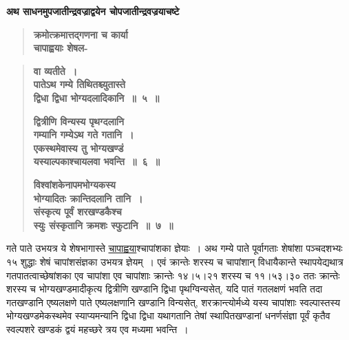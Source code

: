 \documentclass[11pt, openany]{book}
\begin{document}
{\small \textbf{अथ साधनमुपजातीन्द्रवज्राद्वयेन चोपजातीन्द्रवज्रयाचष्टे\textendash }}

 \label{9.5.1}
\begin{quote}
{\large \textbf{{\color{purple}क्रमोत्क्रमात्तद्गणना च कार्या \\
चापाह्वयाः शेषल-}}}
\end{quote}

\newpage

 \label{9.5}
\begin{quote}
{\large \textbf{{\color{purple}वा व्यतीते~। \\
पातेऽथ गम्ये तिथितश्च्युतास्ते \\
द्विधा द्विधा भोग्यदलादिकानि~॥~५~॥}}
\vspace{1mm}

 \label{9.6}
\textbf{{\color{purple}द्वित्रीणि विन्यस्य पृथग्दलानि \\
गम्यानि गम्येऽथ गते गतानि~। \\
एकस्थमेवास्य तु भोग्यखण्डं \\
यस्याल्पकाश्चायलवा भवन्ति~॥~६~॥}}
\vspace{1mm}

 \label{9.7}
\textbf{{\color{purple}विश्वांशकेनापमभोग्यकस्य \\
भोग्यादितः क्रान्तिदलानि तानि~। \\
संस्कृत्य पूर्वं शरखण्डकैश्च \\
स्युः संस्कृतानि क्रमशः स्फुटानि~॥~७~॥}}}
\end{quote}

\begin{sloppypar}
गते पाते उभयत्र ये शेषभागास्ते \hyperref[9.5.1]{चापाह्वया}श्चापांशका ज्ञेयाः~। अथ गम्ये पाते पूर्वागताः शेषांशा पञ्चदशभ्यः १५ शुद्धाः शेषं चापांशसंज्ञका उभयत्र ज्ञेयम्~। एवं क्रान्तेः शरस्य च चापांशान् विधायैकान्ते स्थापयेद्यथात्र गतपातत्वाच्छेषांशका एव चापांशा एव चापांशाः क्रान्तेः १४।५।२१ शरस्य च ११।५३।३० ततः क्रान्तेः शरस्य च भोग्यखण्डमादीकृत्य द्वित्रीणि खण्डानि द्विधा पृथग्विन्यसेत्, यदि पातं गतलक्षणं भवति तदा गतखण्डानि एष्यलक्षणे पाते एष्यलक्षणानि खण्डानि विन्यसेत्, शरक्रान्त्योर्मध्ये यस्य चापांशाः स्वल्पास्तस्य भोग्यखण्डमेकस्थमेव स्याप्यमन्यानि द्विधा द्विधा यथागतानि तेषां स्थापितखण्डानां धनर्णसंज्ञा पूर्वं कृतैव स्वल्पशरे खण्डकं द्वयं महच्छरे त्रय एव मध्यमा भवन्ति~।
\end{sloppypar}

\newpage
\end{document}

